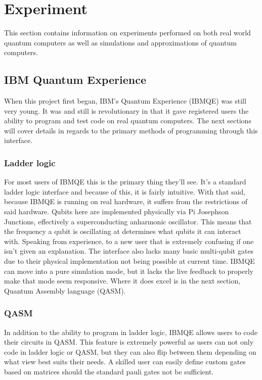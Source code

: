 \documentclass[a4paper]{article}
\begin{document}
\section{Experiment} %
This section contains information on experiments performed on both real world quantum computers as well as simulations and approximations of quantum computers.


\subsection{IBM Quantum Experience}
When this project first began, IBM's Quantum Experience (IBMQE) was still very young.  It was and still is revolutionary in that it gave registered users the ability to program and test code on real quantum computers.  The next sections will cover details in regards to the primary methods of programming through this interface.
\subsubsection{Ladder logic} %
For most users of IBMQE this is the primary thing they'll see.  It's a standard ladder logic interface and because of this, it is fairly intuitive.  With that said, because IBMQE is running on real hardware, it suffers from the restrictions of said hardware.  Qubits here are implemented physically via Pi Josephson Junctions, effectively a superconducting anharmonic oscillator.  This means that the frequency a qubit is oscillating at determines what qubits it can interact with.  Speaking from experience, to a new user that is extremely confusing if one isn't given an explanation.  The interface also lacks many basic multi-qubit gates due to their physical implementation not being possible at current time.\newline
\newline
IBMQE can move into a pure simulation mode, but it lacks the live feedback to properly make that mode seem responsive.  Where it does excel is in the next section, Quantum Assembly language (QASM).
\subsubsection{QASM} %
In addition to the ability to program in ladder logic, IBMQE allows users to code their circuits in QASM.  This feature is extremely powerful as users can not only code in ladder logic or QASM, but they can also flip between them depending on what view best suits their needs.  A skilled user can easily define custom gates based on matrices should the standard pauli gates not be sufficient.  
\end{document}
